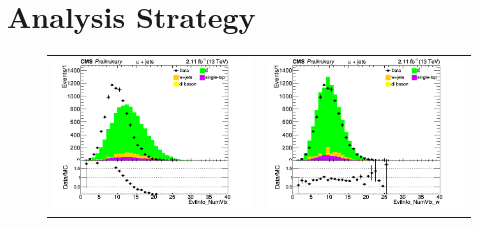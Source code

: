 \documentclass{cmspaper}
\begin{document}
   
\section{Analysis Strategy}
\begin{figure}[htp]
\centering
\begin{tabular}{cc}
\hspace{-0.5cm}
\includegraphics[scale=0.40]{results/EvtInfo_NumVtx.png}
& \hspace{-0.5cm} \includegraphics[scale=0.40]{results/EvtInfo_NumVtx_w.png}\\

\end{tabular}
\end{figure}
\end{document}
